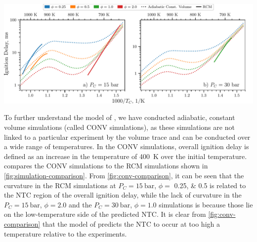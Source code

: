 \documentclass[letterpaper, review, sort&compress]{elsarticle}
\begin{document}
\begin{center}
    \captionsetup{type=figure}
    \includegraphics[width=\textwidth]{figures/constant-volume-comparison.pdf}
    \caption{Comparison of simulated ignition delays computed in an adiabatic, constant volume
    system (dotted lines) and computed using the procedure described in
    \cref{sec:experimental-modeling} (solid lines). a) \SI{15}{\bar}, b) \SI{30}{\bar}.}
    \label{fig:conv-comparison}
\end{center}

To further understand the model of \citet{Dievart2013}, we have conducted adiabatic, constant volume
simulations (called CONV simulations), as these simulations are not linked to a particular
experiment by the volume trace and can be conducted over a wide range of temperatures. In the CONV
simulations, overall ignition delay is defined as an increase in the temperature of \SI{400}{\K}
over the initial temperature.  compares the CONV simulations to the RCM
simulations shown in \cref{fig:simulation-comparison}. From \cref{fig:conv-comparison}, it can be
seen that the curvature in the RCM simulations at \(P_C = \SI{15}{\bar}\), \(\phi =\)
\numlist{0.25;0.5} is related to the NTC region of the overall ignition delay, while the lack of
curvature in the \(P_C = \SI{15}{\bar}\), \(\phi = \num{2.0}\) and the \(P_C = \SI{30}{\bar}\),
\(\phi = \num{1.0}\) simulations is because those lie on the low-temperature side of the predicted
NTC. It is clear from \cref{fig:conv-comparison} that the model of \citet{Dievart2013} predicts the
NTC to occur at too high a temperature relative to the experiments.
\end{document}

